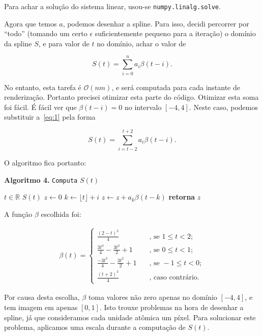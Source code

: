 \documentclass[12pt]{article}
\theoremstyle{plain}
\numberwithin{equation}{section}
\newcommand{\bigo}{\mathcal{O}}
\newcommand{\code}[1]{\lstinline[mathescape=true]{#1}}
\begin{document}
Para achar a solução do sistema linear, usou-se \code{numpy.linalg.solve}.

Agora que temos $a$, podemos desenhar a spline. Para isso, decidi percorrer por ``todo'' (tomando
um certo $\epsilon$ suficientemente pequeno para a iteração) o domínio da spline $S$, e para valor
de $t$ no domínio, achar o valor de

\begin{equation}
  S(t)=\sum_{i=0}^n a_i\beta(t-i).\label{eq:1}
\end{equation}

No entanto, esta tarefa é $\bigo(nm)$, e será computada para cada instante de renderização.
Portanto precisei otimizar esta parte do código. Otimizar esta soma foi fácil. É fácil ver que
$\beta(t-i)=0$ no intervalo $[-4,4]$. Neste caso, podemos substituir a~\autoref{eq:1} pela forma

\begin{equation*}
  S(t)=\sum_{i=t-2}^{t+2} a_i\beta(t-i).
\end{equation*}

O algoritmo fica portanto:

\begin{algorithm}[h]
  \caption*{\textbf{Algoritmo 4.} \code{Computa} $S(t)$}
  \begin{algorithmic}[1]
    \Require $t\in\mathbb{R}$
    \Ensure $S(t)$
    \State $z\gets 0$
      \State $k\gets\lfloor t\rfloor+i$
        \State $z\gets z+a_k\beta(t-k)$
      \EndIf%
    \EndFor%
    \State\textbf{retorna} $z$
  \end{algorithmic}
\end{algorithm}

A função $\beta$ escolhida foi:

\begin{align*}
  \beta(t)=\begin{cases}
    \frac{(2-t)^3}{4} & \quad \text{, se }1\leq t<2;\\
    \frac{3t^3}{4}-\frac{3t^2}{2}+1 & \quad \text{, se }0\leq t<1;\\
    \frac{-3t^3}{4}-\frac{3t^2}{2}+1 & \quad \text{, se }-1\leq t<0;\\
    \frac{(t+2)^3}{4} & \quad \text{, caso contrário.}
  \end{cases}
\end{align*}

Por causa desta escolha, $\beta$ toma valores não zero apenas no domínio $[-4,4]$, e tem imagem em
apenas $[0,1]$. Isto trouxe problemas na hora de desenhar a spline, já que consideramos cada
unidade atômica um píxel. Para solucionar este problema, aplicamos uma escala durante a computação
de $S(t)$.
\end{document}
